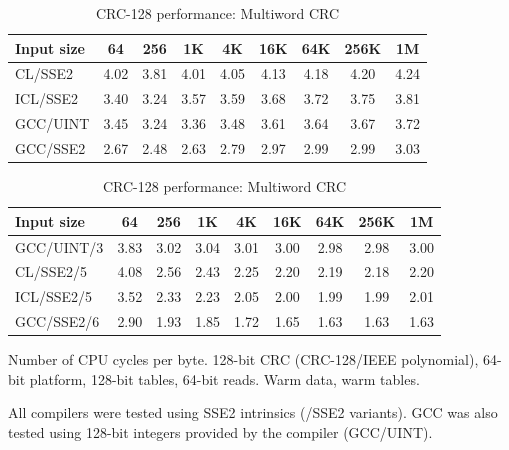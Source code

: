 \documentclass{article}
\begin{document}
\begin{table}
\begin{center}


\caption{CRC-128 performance: Slicing CRC} \label{t:CRC128PerfSlicing}
\begin{tabular}{| l | c | c | c | c | c | c | c | c |}
  \hline
Input size   & 64    & 256   & 1K    & 4K    & 16K   & 64K   & 256K  & 1M       \\
  \hline
     CL/SSE2 &  4.02 &  3.81 &  4.01 &  4.05 &  4.13 &  4.18 &  4.20 &  4.24    \\
    ICL/SSE2 &  3.40 &  3.24 &  3.57 &  3.59 &  3.68 &  3.72 &  3.75 &  3.81    \\
    GCC/UINT &  3.45 &  3.24 &  3.36 &  3.48 &  3.61 &  3.64 &  3.67 &  3.72    \\
    GCC/SSE2 &  2.67 &  2.48 &  2.63 &  2.79 &  2.97 &  2.99 &  2.99 &  3.03    \\
  \hline
\end{tabular}


\caption{CRC-128 performance: Multiword CRC} \label{t:CRC128PerfMultiword}
\begin{tabular}{| l | c | c | c | c | c | c | c | c |}
  \hline
Input size & 64    & 256   & 1K    & 4K    & 16K   & 64K   & 256K  & 1M       \\
  \hline
GCC/UINT/3 &  3.83 &  3.02 &  3.04 &  3.01 &  3.00 &  2.98 &  2.98 &  3.00    \\
 CL/SSE2/5 &  4.08 &  2.56 &  2.43 &  2.25 &  2.20 &  2.19 &  2.18 &  2.20    \\
ICL/SSE2/5 &  3.52 &  2.33 &  2.23 &  2.05 &  2.00 &  1.99 &  1.99 &  2.01    \\
GCC/SSE2/6 &  2.90 &  1.93 &  1.85 &  1.72 &  1.65 &  1.63 &  1.63 &  1.63    \\
  \hline
\end{tabular}
\end{center}

Number of CPU cycles per byte. 128-bit CRC (CRC-128/IEEE polynomial),
64-bit platform, 128-bit tables, 64-bit reads. Warm data, warm tables.

All compilers were tested using SSE2 intrinsics (/SSE2 variants). GCC was
also tested using 128-bit integers provided by the compiler (GCC/UINT).


\end{table}
\end{document}

